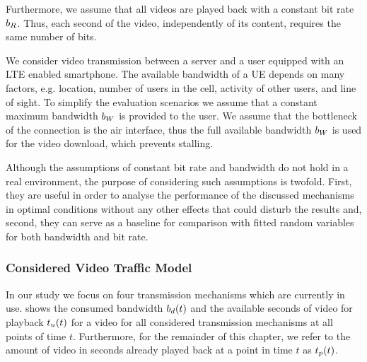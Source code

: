 Furthermore, we assume that all videos are played back with a constant bit rate \(b_R\).
Thus, each second of the video, independently of its content, requires the same number of bits.

We consider video transmission between a server and a user equipped with an \gls{LTE} enabled smartphone.
The available bandwidth of a \gls{UE} depends on many factors, e.g. location, number of users in the cell, activity of other users, and line of sight.
To simplify the evaluation scenarios we assume that a constant maximum bandwidth \(b_W\) is provided to the user.
We assume that the bottleneck of the connection is the air interface, thus the full available bandwidth \(b_W\)  is used for the video download, which prevents stalling.

Although the assumptions of constant bit rate and bandwidth do not hold in a real environment, the purpose of considering such assumptions is twofold.
First, they are useful in order to analyse the performance of the discussed mechanisms in optimal conditions without any other effects that could disturb the results and, second, they can serve as a baseline for comparison with fitted random variables for both bandwidth and bit rate.

\subsubsection*{Considered Video Traffic Model}\label{sec:application:lte_video:system_model:video_traffic}

In our study we focus on four transmission mechanisms which are currently in use.
 shows the consumed bandwidth \(b_d(t)\) and the available seconds of video for playback \(t_u(t)\) for a video for all considered transmission mechanisms at all points of time \(t\).
Furthermore, for the remainder of this chapter, we refer to the amount of video in seconds already played back at a point in time \(t\) as \(t_p(t)\).

